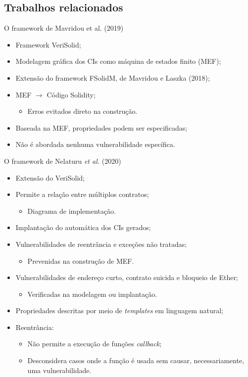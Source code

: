 \subsection{Trabalhos relacionados}
\begin{frame}{O framework de Mavridou et al. (2019)}
    \begin{itemize}
    	\item Framework VeriSolid;
    	\item Modelagem gráfica dos CIs como máquina de estados finito (MEF);
    	\item Extensão do framework FSolidM, de Mavridou e Laszka (2018);
    	\item MEF $\rightarrow$ Código Solidity;
    	\begin{itemize}
    		\item Erros evitados direto na construção.
    	\end{itemize}
    	\item Baseada na MEF, propriedades podem ser especificadas;
    	\item Não é abordada nenhuma vulnerabilidade específica.
    \end{itemize}
\end{frame}

\begin{frame}{O framework de Nelaturu \textit{et al.} (2020)}
	\begin{itemize}
		\item Extensão do VeriSolid;
		\item Permite a relação entre múltiplos contratos;
		\begin{itemize}
			\item Diagrama de implementação.
		\end{itemize} 
		\item Implantação do automática dos CIs gerados;
		\item Vulnerabilidades de reentrância e exceções não tratadas;
		\begin{itemize}
			\item Prevenidas na construção de MEF.
		\end{itemize}
		\item Vulnerabilidades de endereço curto, contrato suicida e bloqueio de Ether;
		\begin{itemize}
			\item Verificadas na modelagem ou implantação.
		\end{itemize}
		\item Propriedades descritas por meio de \textit{templates} em linguagem natural;
		\item Reentrância:
		\begin{itemize}
			\item Não permite a execução de funções \textit{callback};
			\item Desconsidera casos onde a função é usada sem causar, necessariamente, uma vulnerabilidade.
		\end{itemize}
	\end{itemize}
\end{frame}

